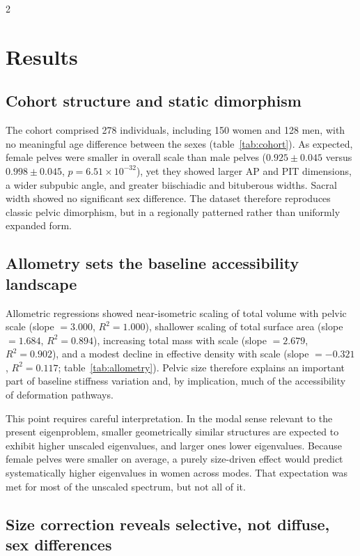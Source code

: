 \documentclass[openacc]{rsproca_new}
\begin{document}
\begin{multicols}{2}
\section{Results}

\subsection{Cohort structure and static dimorphism}

The cohort comprised 278 individuals, including 150 women and 128 men, with no meaningful age difference between the sexes (table~\ref{tab:cohort}). As expected, female pelves were smaller in overall scale than male pelves ($0.925 \pm 0.045$ versus $0.998 \pm 0.045$, $p=6.51 \times 10^{-32}$), yet they showed larger AP and PIT dimensions, a wider subpubic angle, and greater biischiadic and bituberous widths. Sacral width showed no significant sex difference. The dataset therefore reproduces classic pelvic dimorphism, but in a regionally patterned rather than uniformly expanded form.

\subsection{Allometry sets the baseline accessibility landscape}

Allometric regressions showed near-isometric scaling of total volume with pelvic scale (slope $=3.000$, $R^2=1.000$), shallower scaling of total surface area (slope $=1.684$, $R^2=0.894$), increasing total mass with scale (slope $=2.679$, $R^2=0.902$), and a modest decline in effective density with scale (slope $=-0.321$, $R^2=0.117$; table~\ref{tab:allometry}). Pelvic size therefore explains an important part of baseline stiffness variation and, by implication, much of the accessibility of deformation pathways.

This point requires careful interpretation. In the modal sense relevant to the present eigenproblem, smaller geometrically similar structures are expected to exhibit higher unscaled eigenvalues, and larger ones lower eigenvalues. Because female pelves were smaller on average, a purely size-driven effect would predict systematically higher eigenvalues in women across modes. That expectation was met for most of the unscaled spectrum, but not all of it.

\subsection{Size correction reveals selective, not diffuse, sex differences}


\end{multicols}
\end{document}
